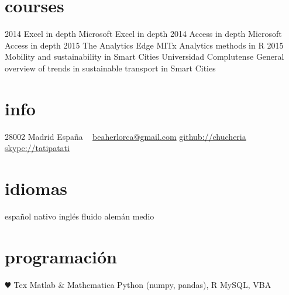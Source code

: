 \documentclass[]{friggeri-cv}
\begin{document}
\section{courses}

\begin{entrylist}
  \entry
    {2014}
    {Excel in depth}
    {}
    {Microsoft Excel in depth}
  \entry
    {2014}
    {Access in depth}
    {}
    {Microsoft Access in depth}
  \entry
    {2015}
    {The Analytics Edge}
    {MITx}
    {Analytics methods in R}
  \entry
    {2015}
    {Mobility and sustainability in Smart Cities}
    {Universidad Complutense}
    {General overview of trends in sustainable transport in Smart Cities}
\end{entrylist}




\else 

       {}


\begin{aside}
  \section{info}
    28002 Madrid
    España
    ~
    \href{mailto:beaherlorca@gmail.com}{beaherlorca@gmail.com}
    \href{https://github.com/chucheria}{github://chucheria}
    \href{<a href="skype:tatipatati?chat">}{skype://tatipatati}
  \section{idiomas}
    español nativo
    inglés fluido
    alemán medio
  \section{programación}
    {\color{red} $\varheartsuit$} Tex
    Matlab \& Mathematica
    Python (numpy, pandas), R
    MySQL, VBA
\end{aside}
\end{document}
